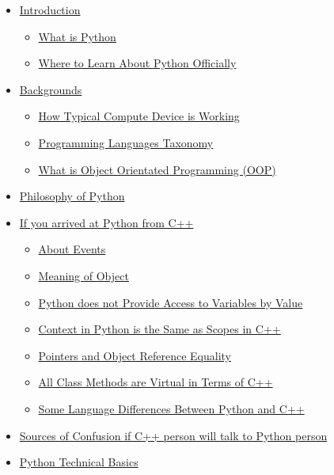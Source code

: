 \documentclass[
]{article}
\begin{document}
\begin{itemize}
\item
  \protect\hyperlink{introduction}{Introduction}

  \begin{itemize}
  \item
    \protect\hyperlink{what-is-python}{What is Python}
  \item
    \protect\hyperlink{where-to-learn-about-python-officially}{Where to
    Learn About Python Officially}
  \end{itemize}
\item
  \protect\hyperlink{backgrounds}{Backgrounds}

  \begin{itemize}
  \item
    \protect\hyperlink{how-typical-compute-device-is-working}{How
    Typical Compute Device is Working}
  \item
    \protect\hyperlink{programming-languages-taxonomy}{Programming
    Languages Taxonomy}
  \item
    \protect\hyperlink{what-is-object-orientated-programming-oop}{What
    is Object Orientated Programming (OOP)}
  \end{itemize}
\item
  \protect\hyperlink{philosophy-of-python}{Philosophy of Python}
\item
  \protect\hyperlink{if-you-arrived-at-python-from-c}{If you arrived at
  Python from C++}

  \begin{itemize}
  \item
    \protect\hyperlink{about-events}{About Events}
  \item
    \protect\hyperlink{meaning-of-object}{Meaning of Object}
  \item
    \protect\hyperlink{python-does-not-provide-access-to-variables-by-value}{Python
    does not Provide Access to Variables by Value}
  \item
    \protect\hyperlink{context-in-python-is-the-same-as-scopes-in-c}{Context
    in Python is the Same as Scopes in C++}
  \item
    \protect\hyperlink{pointers-and-object-reference-equality}{Pointers
    and Object Reference Equality}
  \item
    \protect\hyperlink{all-class-methods-are-virtual-in-terms-of-c}{All
    Class Methods are Virtual in Terms of C++}
  \item
    \protect\hyperlink{some-language-differences-between-python-and-c}{Some
    Language Differences Between Python and C++}
  \end{itemize}
\item
  \protect\hyperlink{sources-of-confusion-if-c-person-will-talk-to-python-person}{Sources
  of Confusion if C++ person will talk to Python person}
\item
  \protect\hyperlink{python-technical-basics}{Python Technical Basics}


\end{itemize}
\end{document}
